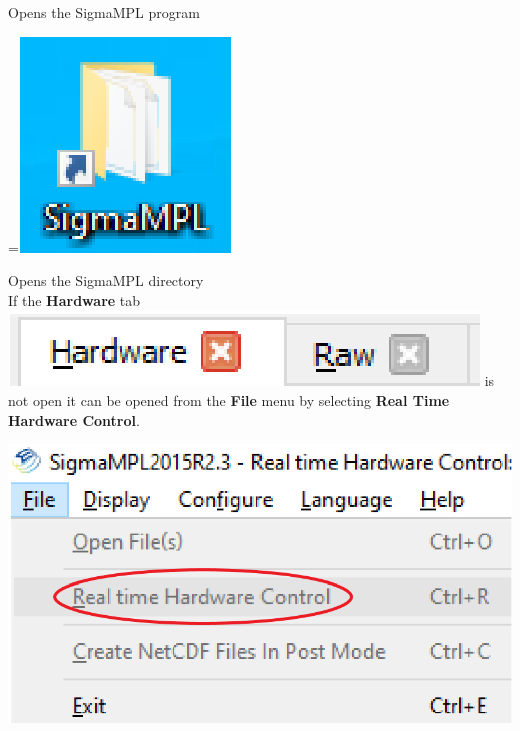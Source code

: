 \documentclass[11pt, oneside]{article}
\begin{document}
 Opens the SigmaMPL program \hfill
{\begingroup
{}=\hbox{\includegraphics[scale=0.4]{sigma_dir.png}}%
\parbox{\wd0}{}\endgroup} Opens the SigmaMPL directory\\

\noindent If the \textbf{Hardware} tab \includegraphics[scale=0.3]{hardware_tab.png} is not open it can be opened from the \textbf{File} menu by selecting \textbf{Real Time Hardware Control}.\\

\begin{center}
\includegraphics[scale=0.7]{open_hardware.png}
\end{center}


           
\end{document}
